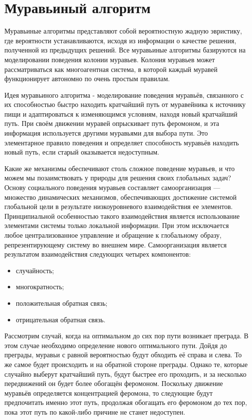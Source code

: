 \documentclass[12pt]{report}
\begin{document}
\section{Муравьиный алгоритм}

Муравьиные алгоритмы представляют собой вероятностную жадную эвристику, где вероятности устанавливаются, исходя из информации о качестве решения, полученной из предыдущих решений. Все муравьиные алгоритмы базируются на моделировании поведения колонии муравьев. Колония муравьев может рассматриваться как многоагентная система, в которой каждый муравей функционирует автономно по очень простым правилам.

Идея муравьиного алгоритма - моделирование поведения муравьёв, связанного с их способностью быстро находить кратчайший путь от муравейника к источнику пищи и адаптироваться к изменяющимся условиям, находя новый кратчайший путь. При своём движении муравей опрыскивает путь феромоном, и эта информация используется другими муравьями для выбора пути. Это элементарное правило поведения и определяет способность муравьёв находить новый путь, если старый оказывается недоступным.

Какие же механизмы обеспечивают столь сложное поведение муравьев, и что можем мы позаимствовать у природы для решения своих глобальных задач? Основу социального поведения муравьев составляет самоорганизация — множество динамических механизмов, обеспечивающих достижение системой глобальной цели в результате низкоуровневого взаимодействия ее элементов. Принципиальной особенностью такого взаимодействия является использование элементами системы только локальной информации. При этом исключается любое централизованное управление и обращение к глобальному образу, репрезентирующему систему во внешнем мире. Самоорганизация является результатом взаимодействия следующих четырех компонентов:
\begin{itemize}
	\item случайность;
	\item многократность;
	\item положительная обратная связь;
	\item отрицательная обратная связь.
\end{itemize}

Рассмотрим случай, когда на оптимальном до сих пор пути возникает преграда. В этом случае необходимо определение нового оптимального пути. Дойдя до преграды, муравьи с равной вероятностью будут обходить её справа и слева. То же самое будет происходить и на обратной стороне преграды. Однако те, которые случайно выберут кратчайший путь, будут быстрее его проходить, и за несколько передвижений он будет более обогащён феромоном. Поскольку движение муравьёв определяется концентрацией феромона, то следующие будут предпочитать именно этот путь, продолжая обогащать его феромоном до тех пор, пока этот путь по какой-либо причине не станет недоступен.
\end{document}
